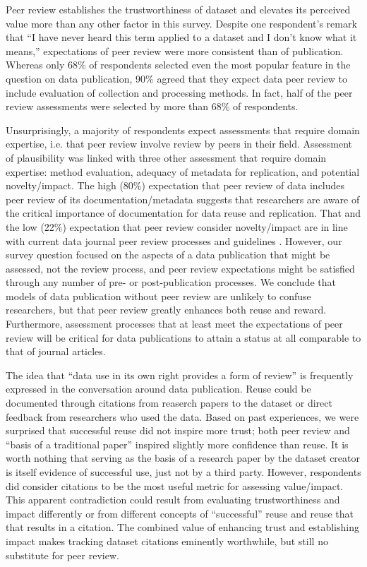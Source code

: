 \documentclass[10pt]{article}
\begin{document}
Peer review establishes the trustworthiness of dataset and elevates its perceived value more than any other factor in this survey.
Despite one respondent's remark that ``I have never heard this term applied to a dataset and I don't know what it means,'' expectations of peer review were more consistent than of publication. 
Whereas only 68\% of respondents selected even the most popular feature in the question on data publication, 90\% agreed that they expect data peer review to include evaluation of collection and processing methods.
In fact, half of the peer review assessments were selected by more than 68\% of respondents.

Unsurprisingly, a majority of respondents expect assessments that require domain expertise, i.e. that peer review involve review by peers in their field.
Assessment of plausibility was linked with three other assessment that require domain expertise: method evaluation, adequacy of metadata for replication, and potential novelty/impact.
The high (80\%) expectation that peer review of data includes peer review of its documentation/metadata suggests that researchers are aware of the critical importance of documentation for data reuse and replication.
That and the low (22\%) expectation that peer review consider novelty/impact are in line with current data journal peer review processes and guidelines \cite{kratz_data_2014}.
However, our survey question focused on the aspects of a data publication that might be assessed, not the review process, and peer review expectations might be satisfied through any number of pre- or post-publication processes.
We conclude that models of data publication without peer review are unlikely to confuse researchers, but that peer review greatly enhances both reuse and reward.
Furthermore, assessment processes that at least meet the expectations of peer review will be critical for data publications to attain a status at all comparable to that of journal articles.

The idea that ``data use in its own right provides a form of review'' \cite{parsons_data_2010} is frequently expressed in the conversation around data publication. 
Reuse could be documented through citations from reaserch papers to the dataset or direct feedback from researchers who used the data.
Based on past experiences, we were surprised that successful reuse did not inspire more trust; both peer review and ``basis of a traditional paper'' inspired slightly more confidence than reuse.
It is worth nothing that serving as the basis of a research paper by the dataset creator is itself evidence of successful use, just not by a third party.
However, respondents did consider citations to be the most useful metric for assessing value/impact.
This apparent contradiction could result from evaluating trustworthiness and impact differently or from different concepts of  ``successful'' reuse and reuse that that results in a citation.
The combined value of enhancing trust and establishing impact makes tracking dataset citations eminently worthwhile, but still no substitute for peer review.
\end{document}
